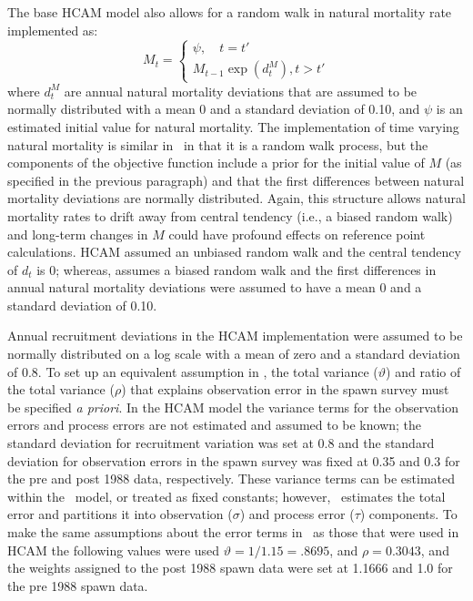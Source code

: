 	The base HCAM model also allows for a random walk in natural mortality rate implemented as:
\[
M_t =\begin{cases}
	 \psi, \quad t=t'\\
	 M_{t-1}\exp(d_t^M), t>t'
	 \end{cases}
\]
where $d_t^M$ are annual natural mortality deviations that are assumed to be normally distributed with a mean 0 and a standard deviation of 0.10, and $\psi$ is an estimated initial value for natural mortality.  The implementation of time varying natural mortality is similar in \iscam\ in that it is a random walk process, but the components of the objective function include a prior for the initial value of $M$ (as specified in the previous paragraph) and that the first differences between natural mortality deviations are normally distributed. Again, this structure allows natural mortality rates to drift away from central tendency (i.e., a biased random walk) and long-term changes in $M$ could have profound effects on reference point calculations.  HCAM assumed an unbiased random walk and the central tendency of $d_t$ is 0; whereas, \iscam assumes a biased random walk and the first differences in annual natural mortality deviations were assumed to have a mean 0 and a standard deviation of 0.10.

Annual recruitment deviations in the HCAM implementation were assumed to be normally distributed on a log scale with a mean of zero and a standard deviation of 0.8.  To set up an equivalent assumption in \iscam, the total variance ($\vartheta$) and ratio of the total variance ($\rho$) that explains observation error in the spawn survey must be specified \emph{a priori}. In the HCAM model the variance terms for the observation errors and process errors are not estimated and assumed to be known; the standard deviation for recruitment variation was set at 0.8 and the standard deviation for observation errors in the spawn survey was fixed at 0.35 and 0.3 for the pre and post 1988 data, respectively.  These variance terms can be estimated within the \iscam\ model, or treated as fixed constants; however, \iscam\ estimates the total error and partitions it into observation ($\sigma$) and process error ($\tau$) components.  To make the same assumptions about the error terms in \iscam\ as those that were used in HCAM the following values were used $\vartheta=1/1.15 = .8695$, and $\rho=0.3043$, and the weights assigned to the post 1988 spawn data were set at 1.1666 and 1.0 for the pre 1988 spawn data.

